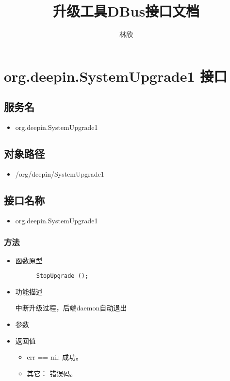 \documentclass{utart}
\title{升级工具DBus接口文档}
\author{林欣}
\begin{document}

\utMakeTOC

\newpage

\section{org.deepin.SystemUpgrade1 接口}
\subsection{服务名}
\begin{itemize}
    \item org.deepin.SystemUpgrade1
\end{itemize}

\subsection{对象路径}
\begin{itemize}
    \item /org/deepin/SystemUpgrade1
\end{itemize}

\subsection{接口名称}
\begin{itemize}
    \item org.deepin.SystemUpgrade1
\end{itemize}

\subsubsection{方法}
\begin{itemize}
    \item 函数原型
    
    \begin{verbatim}
      StopUpgrade ();
    \end{verbatim}
    \item 功能描述
  
    中断升级过程，后端daemon自动退出
    \item 参数
    \item 返回值
      \begin{itemize}
          \item err == nil: 成功。
          \item 其它： 错误码。
      \end{itemize}
\end{itemize}
\end{document}

